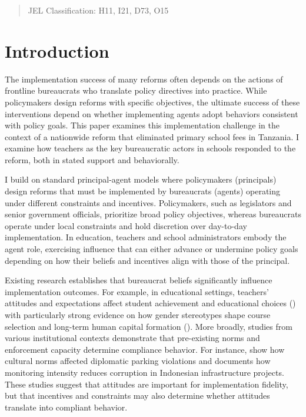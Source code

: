 \documentclass[hidelinks,12pt]{article}
\begin{document}
\begin{singlespace}
\begin{titlepage}
\begin{abstract}
JEL Classification: H11, I21, D73, O15

\bigskip
\end{abstract}
\setcounter{page}{0}
\thispagestyle{empty}
\end{titlepage}
\pagebreak \newpage

\onehalfspacing

\section{Introduction}
\hspace{1em} The implementation success of many reforms often depends on the actions of frontline bureaucrats who translate policy directives into practice. While policymakers design reforms with specific objectives, the ultimate success of these interventions depend on whether implementing agents adopt behaviors consistent with policy goals. This paper examines this implementation challenge in the context of a nationwide reform that eliminated primary school fees in Tanzania. I examine how teachers as the key bureaucratic actors in schools responded to the reform, both in stated support and behaviorally.

I build on standard principal-agent models where policymakers (principals) design reforms that must be implemented by bureaucrats (agents) operating under different constraints and incentives. Policymakers, such as legislators and senior government officials, prioritize broad policy objectives, whereas bureaucrats operate under local constraints and hold discretion over day-to-day implementation. In education, teachers and school administrators embody the agent role, exercising influence that can either advance or undermine policy goals depending on how their beliefs and incentives align with those of the principal.

Existing research establishes that bureaucrat beliefs significantly influence implementation outcomes. For example, in educational settings, teachers' attitudes and expectations affect student achievement and educational choices (\cite{sabarwal_teacher_2022,fives_teachers_2016,liou_climate_2021}) with particularly strong evidence on how gender stereotypes shape course selection and long-term human capital formation (\cite{lavy_gender_2008,lavy_origins_2018}). More broadly, studies from various institutional contexts demonstrate that pre-existing norms and enforcement capacity determine compliance behavior. For instance, \textcite{fisman_corruption_2007} show how cultural norms affected diplomatic parking violations and \textcite{olken_monitoring_2007} documents how monitoring intensity reduces corruption in Indonesian infrastructure projects. These studies suggest that attitudes are important for implementation fidelity, but that incentives and constraints may also determine whether attitudes translate into compliant behavior.


\end{singlespace}
\end{document}
